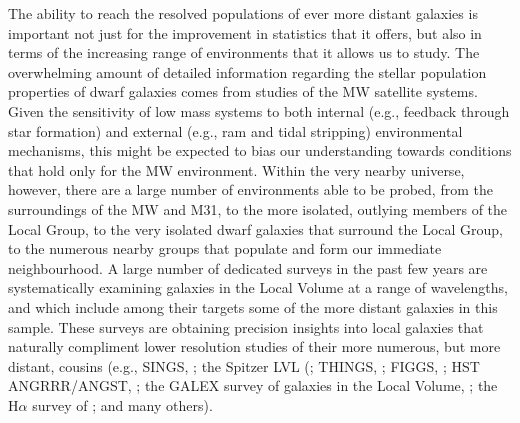 \documentclass[manuscript]{aastex}
\begin{document}
The ability to reach the resolved populations of ever more distant
galaxies is important not just for the improvement in statistics that
it offers, but also in terms of the increasing range of environments
that it allows us to study. The overwhelming amount of detailed
information regarding the stellar population properties of dwarf
galaxies comes from studies of the MW satellite systems. Given the
sensitivity of low mass systems to both internal (e.g., feedback
through star formation) and external (e.g., ram and tidal stripping)
environmental mechanisms, this might be expected to bias our
understanding towards conditions that hold only for the MW
environment. Within the very nearby universe, however, there are a
large number of environments able to be probed, from the surroundings
of the MW and M31, to the more isolated, outlying members of the Local
Group, to the very isolated dwarf galaxies that surround the Local
Group, to the numerous nearby groups that populate and form our
immediate neighbourhood. A large number of dedicated surveys in the
past few years are systematically examining galaxies in the Local
Volume at a range of wavelengths, and which include among their
targets some of the more distant galaxies in this sample. These
surveys are obtaining precision insights into local galaxies that naturally
compliment lower resolution studies of their more numerous, but more
distant, cousins (e.g., SINGS, \cite{kennicutt2003}; the Spitzer LVL
(\citealt{dale2009}; THINGS, \cite{walter2008}; FIGGS,
\cite{begum2008a}; HST ANGRRR/ANGST, \cite{dalcanton2009}; the GALEX
survey of galaxies in the Local Volume, \cite{lee2011}; the H$\alpha$
survey of \cite{kennicutt2008}; and many others).
\end{document}
